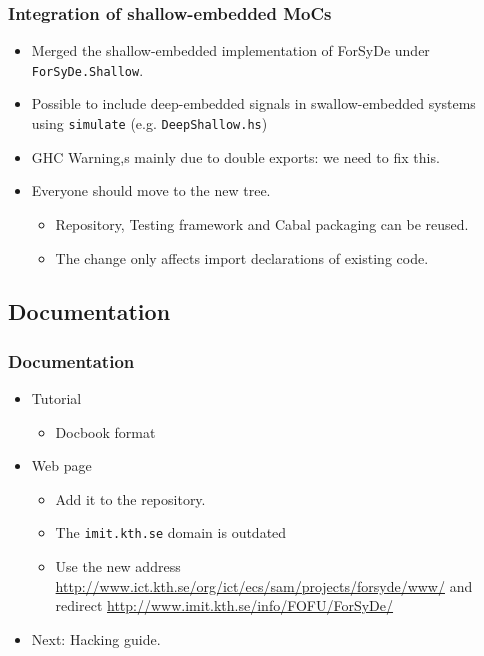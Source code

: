 \documentclass{beamer}
\begin{document}
\begin{frame}
  \frametitle{Integration of shallow-embedded MoCs}
  \begin{itemize}
  \item Merged the shallow-embedded implementation of ForSyDe under
    \texttt{ForSyDe.Shallow}.
  \item Possible to include deep-embedded signals in swallow-embedded
    systems using \texttt{simulate} (e.g. \texttt{DeepShallow.hs})
  \item GHC Warning,s mainly due to double exports: we need to fix this.
  \item Everyone should move to the new tree.
    \begin{itemize}
    \item Repository, Testing framework and Cabal packaging can be
      reused.
    \item The change only affects import declarations of existing code.
    \end{itemize}
  \end{itemize}
  
\end{frame}

\subsection{Documentation}

\begin{frame}
  \frametitle{Documentation}
  \begin{itemize}
  \item Tutorial
    \begin{itemize}
      \item Docbook format
    \end{itemize}
  \item Web page
  \begin{itemize}
    \item Add it to the repository.
    \item The \texttt{imit.kth.se} domain is outdated
    \item Use the new address
      \url{http://www.ict.kth.se/org/ict/ecs/sam/projects/forsyde/www/}
      and redirect \url{http://www.imit.kth.se/info/FOFU/ForSyDe/}
  \end{itemize}
  \item Next: Hacking guide.
  \end{itemize}
  
\end{frame}
\end{document}
